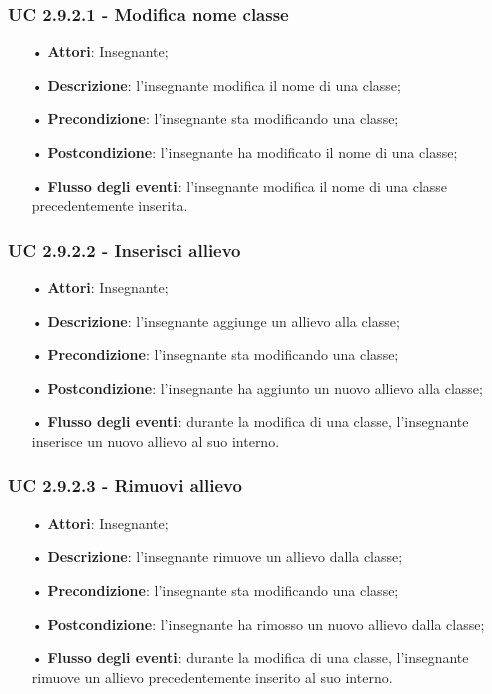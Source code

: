\subsubsection{UC 2.9.2.1 - Modifica nome classe}
\begin{itemize}
	\item[•] \textbf{Attori}: Insegnante;
	\item[•] \textbf{Descrizione}: l'insegnante modifica il nome di una classe;
	\item[•] \textbf{Precondizione}: l'insegnante sta modificando una classe;
	\item[•] \textbf{Postcondizione}: l'insegnante ha modificato il nome di una classe;
	\item[•] \textbf{Flusso degli eventi}: l'insegnante modifica il nome di una classe precedentemente inserita.
\end{itemize}

\subsubsection{UC 2.9.2.2 - Inserisci allievo}
\begin{itemize}
	\item[•] \textbf{Attori}: Insegnante;
	\item[•] \textbf{Descrizione}: l'insegnante aggiunge un allievo alla classe;
	\item[•] \textbf{Precondizione}: l'insegnante sta modificando una classe;
	\item[•] \textbf{Postcondizione}: l'insegnante ha aggiunto un nuovo allievo alla classe;
	\item[•] \textbf{Flusso degli eventi}: durante la modifica di una classe, l'insegnante inserisce un nuovo allievo al suo interno.
\end{itemize}

\subsubsection{UC 2.9.2.3 - Rimuovi allievo}
\begin{itemize}
	\item[•] \textbf{Attori}: Insegnante;
	\item[•] \textbf{Descrizione}: l'insegnante rimuove un allievo dalla classe;
	\item[•] \textbf{Precondizione}: l'insegnante sta modificando una classe;
	\item[•] \textbf{Postcondizione}: l'insegnante ha rimosso un nuovo allievo dalla classe;
	\item[•] \textbf{Flusso degli eventi}: durante la modifica di una classe, l'insegnante rimuove un allievo precedentemente inserito al suo interno.
\end{itemize}


